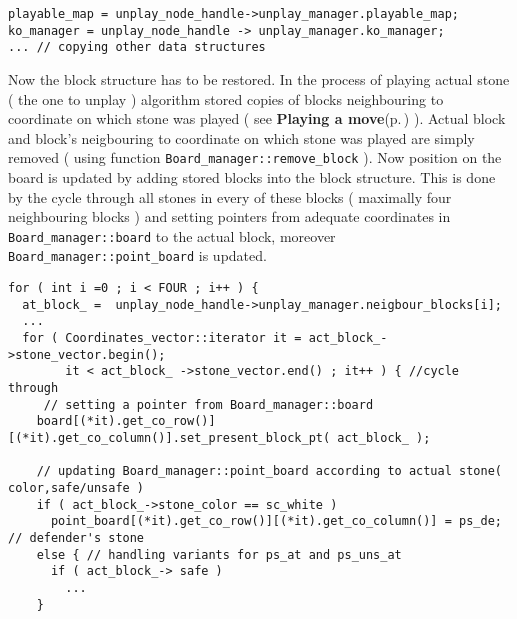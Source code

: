 \footnotesize\begin{verbatim}playable_map = unplay_node_handle->unplay_manager.playable_map; 
ko_manager = unplay_node_handle -> unplay_manager.ko_manager;
... // copying other data structures
\end{verbatim}
\normalsize


Now the block structure has to be restored. In the process of playing actual stone ( the one to unplay ) algorithm stored copies of blocks neighbouring to coordinate on which stone was played ( see {\bf Playing a move}{\rm (p.\,\pageref{page_6_page_6__sec_3})} ). Actual block and block's neigbouring to coordinate on which stone was played are simply removed ( using function {\tt Board\_\-manager::remove\_\-block} ). Now position on the board is updated by adding stored blocks into the block structure. This is done by the cycle through all stones in every of these blocks ( maximally four neighbouring blocks ) and setting pointers from adequate coordinates in {\tt Board\_\-manager::board} to the actual block, moreover {\tt Board\_\-manager::point\_\-board} is updated. 

\footnotesize\begin{verbatim}for ( int i =0 ; i < FOUR ; i++ ) {
  at_block_ =  unplay_node_handle->unplay_manager.neigbour_blocks[i];
  ... 
  for ( Coordinates_vector::iterator it = act_block_->stone_vector.begin(); 
        it < act_block_ ->stone_vector.end() ; it++ ) { //cycle through
     // setting a pointer from Board_manager::board  
    board[(*it).get_co_row()][(*it).get_co_column()].set_present_block_pt( act_block_ );
    
    // updating Board_manager::point_board according to actual stone( color,safe/unsafe )
    if ( act_block_->stone_color == sc_white )  
      point_board[(*it).get_co_row()][(*it).get_co_column()] = ps_de; // defender's stone
    else { // handling variants for ps_at and ps_uns_at 
      if ( act_block_-> safe ) 
        ...
    }
\end{verbatim}
\normalsize


